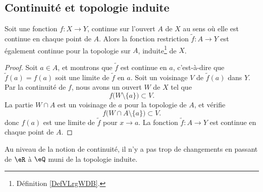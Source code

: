 \subsection{Continuité et topologie induite}
\begin{proposition}     \label{PROPooNPLBooPfmmym}
    Soit une fonction \( f\colon X\to Y\), continue sur l'ouvert \( A\) de \( X\) au sens où elle est continue en chaque point de \( A\). Alors la fonction restriction \( \tilde f\colon A\to Y\) est également continue pour la topologie sur \( A\), induite\footnote{Définition \ref{DefVLrgWDB}.} de \( X\).
\end{proposition}

\begin{proof}
    Soit \( a\in A\), et montrons que \( \tilde f\) est continue en \( a\), c'est-à-dire que \( \tilde f(a)=f(a)\) soit une limite de \( \tilde f\) en \( a\). Soit un voisinage \( V\) de \( \tilde f(a)\) dans \( Y\). Par la continuité de \( f\), nous avons un ouvert \( W\) de \( X\) tel que 
    \begin{equation}
        f\big( W\setminus\{ a \} \big)\subset V.
    \end{equation}
    La partie \( W\cap A\) est un voisinage de \( a\) pour la topologie de \( A\), et vérifie
    \begin{equation}
        f\big( W\cap A\setminus\{ a \} \big)\subset V.
    \end{equation}
    donc \( f(a)\) est une limite de \( \tilde f\) pour \( x\to a\). La fonction \( \tilde f\colon A\to Y\) est continue en chaque point de \( A\).
\end{proof}

Au niveau de la notion de continuité, il n'y a pas trop de changements en passant de \( \eR\) à \( \eQ\) muni de la topologie induite.

